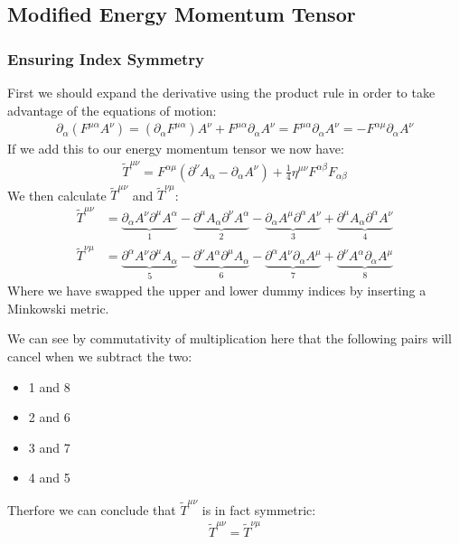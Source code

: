 \documentclass[12pt]{article}
\newcommand{\D}{\partial}
\begin{document}
\subsection{Modified Energy Momentum Tensor}
\subsubsection{Ensuring Index Symmetry}
First we should expand the derivative using the product rule in order to take advantage of the equations of motion:
\begin{align*}
  \D_\alpha(F^{\mu\alpha}A^\nu)=(\D_\alpha F^{\mu\alpha})A^\nu+
  F^{\mu\alpha}\D_\alpha A^\nu=F^{\mu\alpha}\D_\alpha A^\nu=-F^{\alpha\mu}
  \D_\alpha A^\nu
\end{align*}
If we add this to our energy momentum tensor we now have:
\begin{align*}
  \tilde{T}^{\mu\nu}=F^{\alpha\mu}(\D^\nu A_\alpha-\D_\alpha A^\nu)
  +\frac14\eta^{\mu\nu}F^{\alpha\beta}F_{\alpha\beta}
\end{align*}
We then calculate $\tilde{T}^{\mu\nu}$ and $\tilde{T}^{\nu\mu}$:
\begin{align*}
  \tilde{T}^{\mu\nu}&=
  \underbrace{\D_\alpha A^\nu\D^\mu A^\alpha}_1
  -\underbrace{\D^\mu A_\alpha\D^\nu A^\alpha}_2
  -\underbrace{\D_\alpha A^\mu\D^\alpha A^\nu}_3
  +\underbrace{\D^\mu A_\alpha\D^\alpha A^\nu}_4\\
  \tilde{T}^{\nu\mu}&=
  \underbrace{\D^\alpha A^\nu\D^\mu A_\alpha}_5
  -\underbrace{\D^\nu A^\alpha\D^\mu A_\alpha}_6
  -\underbrace{\D^\alpha A^\nu\D_\alpha A^\mu}_7
  +\underbrace{\D^\nu A^\alpha\D_\alpha A^\mu}_8
\end{align*}
Where we have swapped the upper and lower dummy indices by inserting a Minkowski metric.

We can see by commutativity of multiplication here that the following pairs will cancel when we subtract the two:
\begin{center}
  \begin{varwidth}{\textwidth}
    \begin{itemize}
    \item 1 and 8
    \item 2 and 6
    \item 3 and 7
    \item 4 and 5
    \end{itemize}
  \end{varwidth}
\end{center}
Therfore we can conclude that $\tilde{T}^{\mu\nu}$ is in fact symmetric:
\begin{align*}
  \boxed{\tilde{T}^{\mu\nu}=\tilde{T}^{\nu\mu}}
\end{align*}
\end{document}
